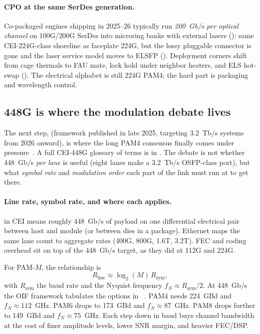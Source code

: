 \paragraph{CPO at the same SerDes generation.}
Co-packaged engines shipping in 2025--26 typically run \emph{200~Gb/s per optical
channel} on 100G/200G SerDes into microring banks with external lasers
(): same CEI-224G-class shoreline as faceplate 224G, but the
lossy pluggable connector is gone and the laser service model moves to ELSFP
(). Deployment corners shift from cage thermals to FAU mate,
lock hold under neighbor heaters, and ELS hot-swap
(). The electrical alphabet is still 224G PAM4; the
hard part is packaging and wavelength control.


\subsection{448G is where the modulation debate lives}
\label{sec:448g}

The next step,  (framework published in late 2025, targeting
3.2~Tb/s systems from 2026 onward), is where the long PAM4 consensus finally comes
under pressure~. A full CEI-448G glossary of terms is in
. The debate is not whether 448~Gb/s \emph{per lane} is
useful (eight lanes make a 3.2~Tb/s OSFP-class port), but what \emph{symbol rate}
and \emph{modulation order} each part of the link must run at to get there.

\paragraph{Line rate, symbol rate, and where each applies.}

 in CEI means roughly 448~Gb/s of payload on one differential
electrical pair between host and module (or between dies in a package). Ethernet
maps the same lane count to aggregate rates (400G, 800G, 1.6T, 3.2T). FEC and
coding overhead sit on top of the 448~Gb/s target, as they did at 112G and 224G.

For PAM-$M$, the relationship is
\[
  R_{\mathrm{line}} \approx \log_2(M)\,R_{\mathrm{sym}},
\]
with $R_{\mathrm{sym}}$ the baud rate and the Nyquist frequency $f_N\approx
R_{\mathrm{sym}}/2$. At 448~Gb/s the OIF framework tabulates the options in
~. PAM4 needs 224~GBd and $f_N\approx112$~GHz.
PAM6 drops to 173~GBd and $f_N\approx87$~GHz. PAM8 drops further to 149~GBd and
$f_N\approx75$~GHz. Each step down in baud buys channel bandwidth at the cost of
finer amplitude levels, lower SNR margin, and heavier FEC/DSP.

